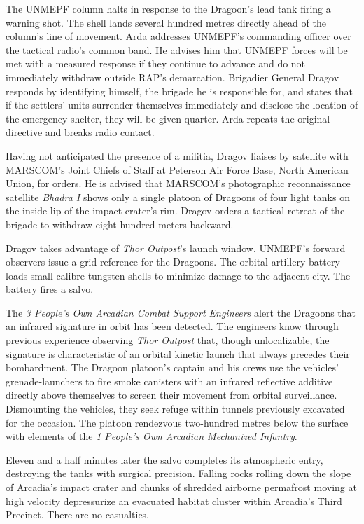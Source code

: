 The UNMEPF column halts in response to the Dragoon's lead tank firing a warning shot. The shell lands several hundred metres directly ahead of the column's line of movement. Arda addresses UNMEPF's commanding officer over the tactical radio's common band. He advises him that UNMEPF forces will be met with a measured response if they continue to advance and do not immediately withdraw outside RAP's demarcation. Brigadier General Dragov responds by identifying himself, the brigade he is responsible for, and states that if the settlers' units surrender themselves immediately and disclose the location of the emergency shelter, they will be given quarter. Arda repeats the original directive and breaks radio contact.

Having not anticipated the presence of a militia, Dragov liaises by satellite with MARSCOM's Joint Chiefs of Staff at Peterson Air Force Base, North American Union, for orders. He is advised that MARSCOM's photographic reconnaissance satellite {\it Bhadra I} shows only a single platoon of Dragoons of four light tanks on the inside lip of the impact crater's rim. Dragov orders a tactical retreat of the brigade to withdraw eight-hundred meters backward.
\StopTimelineDate

Dragov takes advantage of {\it Thor Outpost}'s launch window. UNMEPF's forward observers issue a grid reference for the Dragoons. The orbital artillery battery loads small calibre tungsten shells to minimize damage to the adjacent city. The battery fires a salvo.

The {\it 3 People's Own Arcadian Combat Support Engineers} alert the Dragoons that an infrared signature in orbit has been detected. The engineers know through previous experience observing {\it Thor Outpost} that, though unlocalizable, the signature is characteristic of an orbital kinetic launch that always precedes their bombardment. The Dragoon platoon's captain and his crews use the vehicles' grenade-launchers to fire smoke canisters with an infrared reflective additive directly above themselves to screen their movement from orbital surveillance. Dismounting the vehicles, they seek refuge within tunnels previously excavated for the occasion. The platoon rendezvous two-hundred metres below the surface with elements of the {\it 1 People's Own Arcadian Mechanized Infantry}.

Eleven and a half minutes later the salvo completes its atmospheric entry, destroying the tanks with surgical precision. Falling rocks rolling down the slope of Arcadia's impact crater and chunks of shredded airborne permafrost moving at high velocity depressurize an evacuated habitat cluster within Arcadia's Third Precinct. There are no casualties.

